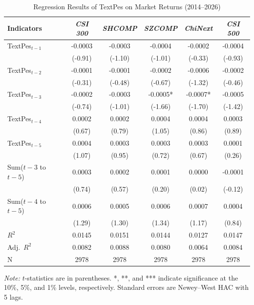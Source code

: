 \documentclass[AER]{AEA}
\begin{document}
\begin{table}[h!]
\caption{Regression Results of TextPes on Market Returns (2014--2026)}
\label{tab:TextPes_regression_results}
    \setlength{\tabcolsep}{4pt}
    \small
\begin{tabular}{lccccc}
\toprule
Indicators & \textit{CSI 300} & \textit{SHCOMP} & \textit{SZCOMP} & \textit{ChiNext} & \textit{CSI 500} \\
\midrule
TextPes$_{t-1}$ & -0.0003 & -0.0003 & -0.0004 & -0.0002 & -0.0004 \\
& (-0.91) & (-1.10) & (-1.01) & (-0.33) & (-0.93) \\
TextPes$_{t-2}$ & -0.0001 & -0.0001 & -0.0002 & -0.0006 & -0.0002 \\
& (-0.31) & (-0.48) & (-0.67) & (-1.32) & (-0.46) \\
TextPes$_{t-3}$ & -0.0002 & -0.0003 & -0.0005* & -0.0007* & -0.0005 \\
& (-0.74) & (-1.01) & (-1.66) & (-1.70) & (-1.42) \\
TextPes$_{t-4}$ & 0.0002 & 0.0002 & 0.0004 & 0.0004 & 0.0003 \\
& (0.67) & (0.79) & (1.05) & (0.86) & (0.89) \\
TextPes$_{t-5}$ & 0.0004 & 0.0003 & 0.0003 & 0.0003 & 0.0001 \\
& (1.07) & (0.95) & (0.72) & (0.67) & (0.26) \\
\midrule
Sum($t-3$ to $t-5$) & 0.0003 & 0.0002 & 0.0001 & 0.0000 & -0.0001 \\
& (0.74) & (0.57) & (0.20) & (0.02) & (-0.12) \\
Sum($t-4$ to $t-5$) & 0.0006 & 0.0005 & 0.0006 & 0.0007 & 0.0004 \\
& (1.29) & (1.30) & (1.34) & (1.17) & (0.84) \\
\midrule
$R^2$ & 0.0145 & 0.0151 & 0.0144 & 0.0127 & 0.0147 \\
Adj.\ $R^2$ & 0.0082 & 0.0088 & 0.0080 & 0.0064 & 0.0084 \\
N & 2978 & 2978 & 2978 & 2978 & 2978 \\
\bottomrule
\end{tabular}

\vspace{0.2cm}
\footnotesize
\textit{Note:} $t$-statistics are in parentheses. *, **, and *** indicate significance at the 10\%, 5\%, and 1\% levels, respectively. Standard errors are Newey--West HAC with 5 lags.
\end{table}

\end{document}

